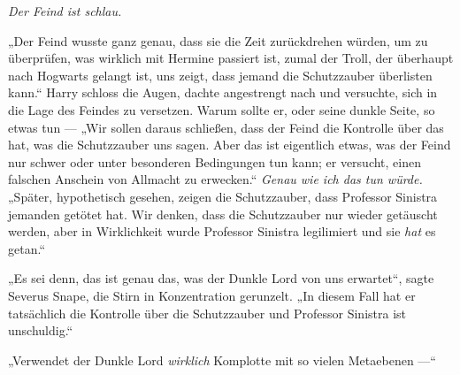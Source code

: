 \emph{Der Feind ist schlau.}

„Der Feind wusste ganz genau, dass sie die Zeit zurückdrehen würden, um zu überprüfen, was wirklich mit Hermine passiert ist, zumal der Troll, der überhaupt nach Hogwarts gelangt ist, uns zeigt, dass jemand die Schutzzauber überlisten kann.“ Harry schloss die Augen, dachte angestrengt nach und versuchte, sich in die Lage des Feindes zu versetzen. Warum sollte er, oder seine dunkle Seite, so etwas tun —
„Wir sollen daraus schließen, dass der Feind die Kontrolle über das hat, was die Schutzzauber uns sagen. Aber das ist eigentlich etwas, was der Feind nur schwer oder unter besonderen Bedingungen tun kann; er versucht, einen falschen Anschein von Allmacht zu erwecken.“ \emph{Genau wie ich das tun würde.}
„Später, hypothetisch gesehen, zeigen die Schutzzauber, dass Professor Sinistra jemanden getötet hat. Wir denken, dass die Schutzzauber nur wieder getäuscht werden, aber in Wirklichkeit wurde Professor Sinistra legilimiert und sie \emph{hat} es getan.“

„Es sei denn, das ist genau das, was der Dunkle Lord von uns erwartet“, sagte Severus Snape, die Stirn in Konzentration gerunzelt.
„In diesem Fall hat er tatsächlich die Kontrolle über die Schutzzauber und Professor Sinistra ist unschuldig.“

„Verwendet der Dunkle Lord \emph{wirklich} Komplotte mit so vielen Metaebenen —“

